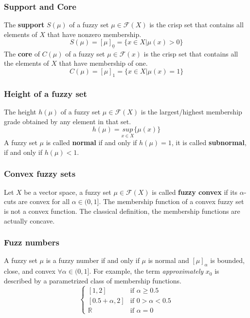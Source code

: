 \documentclass{article}
\begin{document}
\subsubsection{Support and Core}
The \textbf{support} $S(\mu)$ of a fuzzy set $\mu\in\mathcal{F}(X)$ is the crisp set that contains all elements
of $X$ that have nonzero membership.
$$S(\mu)=[\mu]_{\underline{0}}=\{x\in X|\mu(x)>0\}$$
The \textbf{core} of $C(\mu)$ of a fuzzy set $\mu\in\mathcal{F}(x)$ is the crisp set that contains
all the elements of $X$ that have membership of one.
$$C(\mu)=[\mu]_1=\{x\in X|\mu(x)=1\}$$

\subsubsection{Height of a fuzzy set}
The height $h(\mu)$ of a fuzzy set $\mu\in\mathcal{F}(X)$ is the largest/highest membership grade obtained
by any element in that set.
$$h(\mu)=\underset{x\in X}{sup}\{\mu(x)\}$$
A fuzzy set $\mu$ is called \textbf{normal} if and only if $h(\mu)=1$, it is called \textbf{subnormal},
if and only if $h(\mu)<1$.

\subsubsection{Convex fuzzy sets}
Let $X$ be a vector space, a fuzzy set $\mu\in\mathcal{F}(X)$ is called \textbf{fuzzy convex}
if its $\alpha$-cuts are convex for all $\alpha\in (0,1]$. The membership function of a convex fuzzy
set is not a convex function.
\newline\newline
The classical definition, the membership functions are actually concave.

\subsubsection{Fuzz numbers}
A fuzzy set $\mu$ is a fuzzy number if and only if $\mu$ is normal and $[\mu]_\alpha$ is bounded, close,
and convex $\forall\alpha\in (0,1]$.
For example, the term \textit{approximately} $x_0$ is described by a parametrized class of membership
functions.
\[
    \begin{cases}
        [1,2]          & \text{if }\alpha\geq 0.5 \\
        [0.5+\alpha,2] & \text{if } 0>\alpha<0.5  \\
        \mathbb{R}     & \text{if }\alpha =0
    \end{cases}
\]
\end{document}
